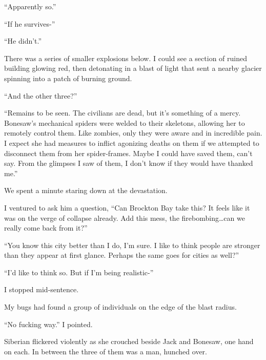 ``Apparently so.''



``If he survives-''



``He didn't.''



There was a series of smaller explosions below.  I could see a section of ruined building glowing red, then detonating in a blast of light that sent a nearby glacier spinning into a patch of burning ground.



``And the other three?''



``Remains to be seen.  The civilians are dead, but it's something of a mercy.  Bonesaw's mechanical spiders were welded to their skeletons, allowing her to remotely control them.  Like zombies, only they were aware and in incredible pain.  I expect she had measures to inflict agonizing deaths on them if we attempted to disconnect them from her spider-frames.  Maybe I could have saved them, can't say.  From the glimpses I saw of them, I don't know if they would have thanked me.''



We spent a minute staring down at the devastation.



I ventured to ask him a question, ``Can Brockton Bay take this?  It feels like it was on the verge of collapse already.  Add this mess, the firebombing\ldots can we really come back from it?''



``You know this city better than I do, I'm sure.  I like to think people are stronger than they appear at first glance.  Perhaps the same goes for cities as well?''



``I'd like to think so.  But if I'm being realistic-''



I stopped mid-sentence.



My bugs had found a group of individuals on the edge of the blast radius.



``No fucking way.''  I pointed.



Siberian flickered violently as she crouched beside Jack and Bonesaw, one hand on each.  In between the three of them was a man, hunched over.



